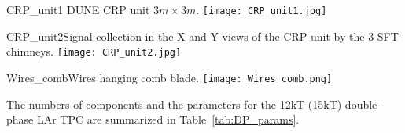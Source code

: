 \begin{cdrfigure}{CRP_unit1}{ DUNE CRP unit $3m\times 3m$.}
\texttt{[image: CRP\_unit1.jpg]}
\end{cdrfigure}

\begin{cdrfigure}{CRP_unit2}{Signal collection in the X and Y views of the CRP unit by the 3 SFT chimneys.}
\texttt{[image: CRP\_unit2.jpg]}
\end{cdrfigure}

\begin{cdrfigure}{Wires_comb}{Wires hanging comb blade.}
\texttt{[image: Wires\_comb.png]}
\end{cdrfigure}

The numbers of components and the parameters for the 12kT (15kT) double-phase  LAr TPC are summarized in Table~\ref{tab:DP_params}.


